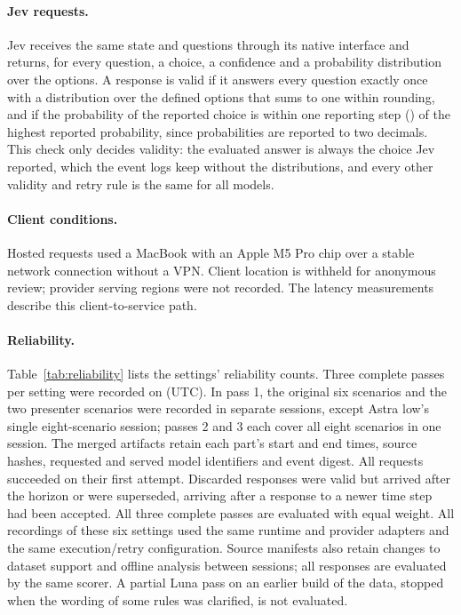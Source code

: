 \paragraph{Jev requests.}
Jev receives the same state and questions through its native interface and returns, for every question, a choice, a confidence and a probability distribution over the options.
A response is valid if it answers every question exactly once with a distribution over the defined options that sums to one within rounding, and if the probability of the reported choice is within one reporting step (\JevReportStep) of the highest reported probability, since probabilities are reported to two decimals.
This check only decides validity: the evaluated answer is always the choice Jev reported, which the event logs keep without the distributions, and every other validity and retry rule is the same for all models.

\paragraph{Client conditions.}
Hosted requests used a MacBook with an Apple M5 Pro chip over a stable network connection without a VPN. Client location is withheld for anonymous review; provider serving regions were not recorded. The latency measurements describe this client-to-service path.

\paragraph{Reliability.}
Table~\ref{tab:reliability} lists the \NumSettingsWord{} settings' reliability counts. Three complete passes per setting were recorded on \RecordingDatesUTC{} (UTC). In pass 1, the original six scenarios and the two presenter scenarios were recorded in separate sessions, except Astra low's single eight-scenario session; passes 2 and 3 each cover all eight scenarios in one session. The merged artifacts retain each part's start and end times, source hashes, requested and served model identifiers and event digest.
All requests succeeded on their first attempt.
Discarded responses were valid but arrived after the horizon or were superseded, arriving after a response to a newer time step had been accepted.
All three complete passes are evaluated with equal weight.
All recordings of these six settings used the same runtime and provider adapters and the same execution/retry configuration. Source manifests also retain changes to dataset support and offline analysis between sessions; all responses are evaluated by the same scorer.
A partial Luna pass on an earlier build of the data, stopped when the wording of some rules was clarified, is not evaluated.

